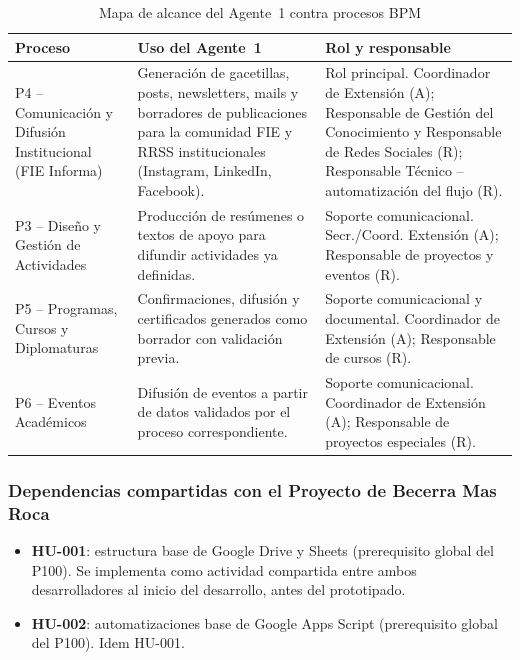 \documentclass[a4paper, 12pt]{article}
\begin{document}
\begin{table}[H]
  \centering
  \caption{Mapa de alcance del Agente~1 contra procesos BPM}
  \label{tab:mapa-procesos-a1}
  \footnotesize
  \begin{tabularx}{\textwidth}{L{0.22\textwidth}Y L{0.28\textwidth}}
    \toprule
    \textbf{Proceso} & \textbf{Uso del Agente~1} & \textbf{Rol y responsable} \\
    \midrule
    P4 -- Comunicaci\'on y Difusi\'on Institucional (FIE Informa) & Generaci\'on de gacetillas, posts, newsletters, mails y borradores de publicaciones para la comunidad FIE y \ac{RRSS} institucionales (Instagram, LinkedIn, Facebook). & Rol principal. Coordinador de Extensi\'on (A); Responsable de Gesti\'on del Conocimiento y Responsable de Redes Sociales (R); Responsable T\'ecnico -- automatizaci\'on del flujo (R). \\
    P3 -- Dise\~no y Gesti\'on de Actividades & Producci\'on de res\'umenes o textos de apoyo para difundir actividades ya definidas. & Soporte comunicacional. Secr./Coord. Extensi\'on (A); Responsable de proyectos y eventos (R). \\
    P5 -- Programas, Cursos y Diplomaturas & Confirmaciones, difusi\'on y certificados generados como borrador con validaci\'on previa. & Soporte comunicacional y documental. Coordinador de Extensi\'on (A); Responsable de cursos (R). \\
    P6 -- Eventos Acad\'emicos & Difusi\'on de eventos a partir de datos validados por el proceso correspondiente. & Soporte comunicacional. Coordinador de Extensi\'on (A); Responsable de proyectos especiales (R). \\
    \bottomrule
  \end{tabularx}
\end{table}

\subsubsection{Dependencias compartidas con el Proyecto de Becerra Mas Roca}

\begin{itemize}
  \item \textbf{HU-001}: estructura base de Google Drive y Sheets (prerequisito global del \ac{P100}). Se implementa como actividad compartida entre ambos desarrolladores al inicio del desarrollo, antes del prototipado.
  \item \textbf{HU-002}: automatizaciones base de Google Apps Script (prerequisito global del \ac{P100}). Idem HU-001.
\end{itemize}
\end{document}
